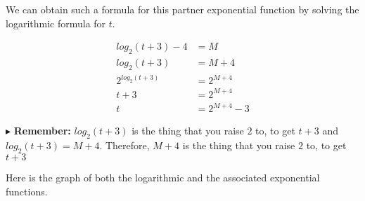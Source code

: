 \documentclass{ximera}
\begin{document}
We can obtain such a formula for this partner exponential function by solving the logarithmic formula for $t$.





\begin{align*}
log_2(t+3) - 4 & = M \\
log_2(t+3) & = M + 4 \\
2^{log_2(t+3)} & = 2^{M+4} \\
t+3 & = 2^{M+4} \\
t & = 2^{M+4} - 3
\end{align*}


$\blacktriangleright$ \textbf{Remember:} $log_2(t+3)$ is the thing that you raise $2$ to, to get $t+3$ and $log_2(t+3) = M+4$.  Therefore, $M+4$ is the thing that you raise $2$ to, to get $t+3$





Here is the graph of both the logarithmic and the associated exponential functions.
\end{document}
